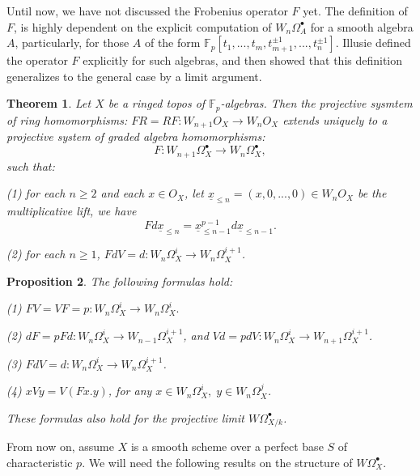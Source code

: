 \documentclass[a4paper,12pt,twoside]{report}
\newtheorem{theorem}{Theorem}[section]
\newtheorem{proposition}[theorem]{Proposition}
\newcommand{\F}{\mathbb{F}}
\begin{document}
\begin{appendices}
    Until now, we have not discussed the Frobenius operator $F$ yet. 
    The definition of $F$, 
    is highly dependent on the explicit computation of $W_{n}\Omega^\bullet_A$ for a smooth algebra $A$, 
    particularly, for those $A$ of the form $\F_p[t_1,...,t_m,t_{m+1}^{\pm1},...,t_n^{\pm 1}]$. 
    Illusie defined  the operator $F$ explicitly for such algebras, 
    and then showed that this definition generalizes to the general case by a limit argument. 
    
    \begin{theorem}
        Let $X$ be a ringed topos of $\F_p$-algebras. 
        Then the projective sysmtem of ring homomorphisms: $FR=RF: W_{n+1}O_X\rightarrow W_nO_X$ 
        extends uniquely to a projective system of graded algebra homomorphisms: 
        \[F:W_{n+1}\Omega^\bullet_{X}\rightarrow W_n\Omega^\bullet_{X},\]
        such that: 
    
        {\rm (1)} for each $n\geqslant 2$ and each $x\in O_X$, 
        let $\underline{x}_{\leqslant n}=(x,0,...,0)\in W_nO_X$ be the multiplicative lift, we have 
        \[Fd\underline{x}_{\leqslant n}=\underline{x}_{\leqslant n-1}^{p-1}d\underline{x}_{\leqslant n-1}.\]
    
        {\rm (2)} for each $n\geqslant 1$, $FdV=d:W_{n}\Omega^i_{X}\rightarrow W_n\Omega^{i+1}_X$. 
    \end{theorem}
    
    \begin{proposition}The following formulas hold: 
        
        {\rm (1)} $FV=VF=p: W_n\Omega^i_X\rightarrow W_n\Omega^i_X.$
    
        {\rm (2)} $dF=pFd: W_n\Omega^i_X\rightarrow W_{n-1}\Omega^{i+1}_X$, and
                  $Vd=pdV: W_n\Omega^i_X\rightarrow W_{n+1}\Omega^{i+1}_X$.
    
        {\rm (3)} $FdV=d: W_n\Omega^i_X\rightarrow W_n\Omega^{i+1}_X$.
    
        {\rm (4)} $xVy=V(Fx.y)$, for any $x\in W_n\Omega^i_X,\;y\in W_{n}\Omega^j_X$.
    
        These formulas also hold for the projective limit $W\Omega^\bullet_{X/k}$. 
    \end{proposition}
    
    
    From now on, assume $X$ is a smooth scheme over a perfect base $S$ of characteristic $p$. 
    We will need the following results on the structure of \( W\Omega_X^\bullet \).
    
    \medskip
    

\end{appendices}
\end{document}
